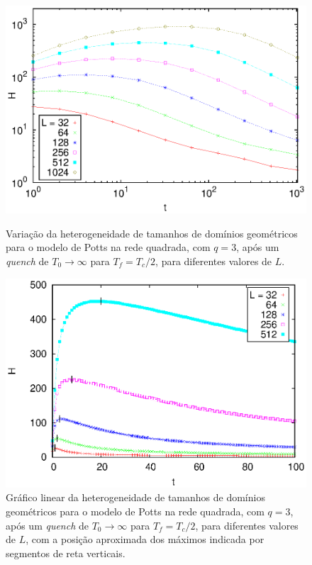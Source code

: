 \begin{figure}[p]
 \centering
 \includegraphics[width=14cm]{fig/het_q3_Tinf_Tc2.eps}
 \caption{Variação da heterogeneidade de tamanhos de domínios geométricos para o modelo de Potts na rede quadrada, com $q=3$, após um \textit{quench} de $T_0\rightarrow \infty$ para $T_f=T_c/2$, para diferentes valores de $L$.}
\label{fig.het_q3_Tinf_Tc2}
\vspace{8mm}
 \includegraphics[width=14cm]{fig/hetevlin_q3_Tinf_Tc2.eps}
 \caption{Gráfico linear da heterogeneidade de tamanhos de domínios geométricos para o modelo de Potts na rede quadrada, com $q=3$, após um \textit{quench} de $T_0\rightarrow \infty$ para $T_f=T_c/2$, para diferentes valores de $L$, com a posição aproximada dos máximos indicada por segmentos de reta verticais.}
\label{fig.hetevlin_q3_Tinf_Tc2}
\end{figure}

